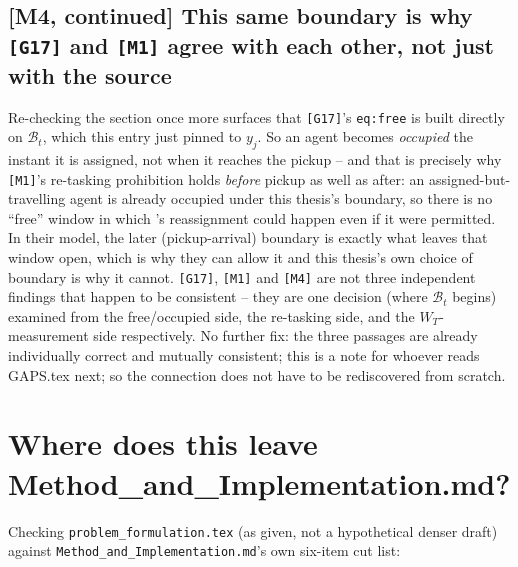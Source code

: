 \documentclass[11pt]{article}
\begin{document}
\subsection*{[M4, continued] This same boundary is why \texttt{[G17]} and \texttt{[M1]} agree with each other, not just with the source}
Re-checking the section once more surfaces that \texttt{[G17]}'s
\texttt{eq:free} is built directly on $\mathcal{B}_t$, which this entry just
pinned to $y_j$. So an agent becomes \emph{occupied} the instant it is
assigned, not when it reaches the pickup -- and that is precisely why
\texttt{[M1]}'s re-tasking prohibition holds \emph{before} pickup as well as
after: an assigned-but-travelling agent is already occupied under this
thesis's boundary, so there is no ``free'' window in which
\citeauthor{ma2017lifelong}'s reassignment could happen even if it were
permitted. In their model, the later (pickup-arrival) boundary is exactly
what leaves that window open, which is why they can allow it and this
thesis's own choice of boundary is why it cannot. \texttt{[G17]},
\texttt{[M1]} and \texttt{[M4]} are not three independent findings that
happen to be consistent -- they are one decision (where $\mathcal{B}_t$
begins) examined from the free/occupied side, the re-tasking side, and the
$W_T$-measurement side respectively. No further fix: the three passages are
already individually correct and mutually consistent; this is a note for
whoever reads GAPS.tex next; so the connection does not have to be
rediscovered from scratch.

\section{Where does this leave Method\_and\_Implementation.md?}
\label{sec:method-mapping}

Checking \texttt{problem\_formulation.tex} (as given, not a hypothetical
denser draft) against \texttt{Method\_and\_Implementation.md}'s own
six-item cut list:
\end{document}
